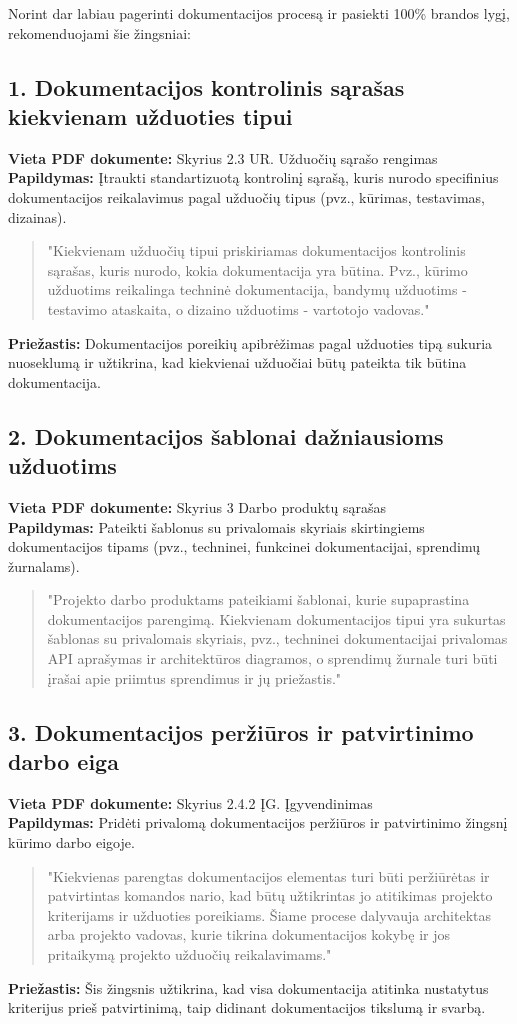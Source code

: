 \documentclass{article}
\begin{document}
Norint dar labiau pagerinti dokumentacijos procesą ir pasiekti 100\% brandos lygį, rekomenduojami šie žingsniai:

\subsection*{1. Dokumentacijos kontrolinis sąrašas kiekvienam užduoties tipui}
\textbf{Vieta PDF dokumente:} Skyrius 2.3 UR. Užduočių sąrašo rengimas \\
\textbf{Papildymas:} Įtraukti standartizuotą kontrolinį sąrašą, kuris nurodo specifinius dokumentacijos reikalavimus pagal užduočių tipus (pvz., kūrimas, testavimas, dizainas).
\begin{quote}
"Kiekvienam užduočių tipui priskiriamas dokumentacijos kontrolinis sąrašas, kuris nurodo, kokia dokumentacija yra būtina. Pvz., kūrimo užduotims reikalinga techninė dokumentacija, bandymų užduotims - testavimo ataskaita, o dizaino užduotims - vartotojo vadovas."
\end{quote}
\textbf{Priežastis:} Dokumentacijos poreikių apibrėžimas pagal užduoties tipą sukuria nuoseklumą ir užtikrina, kad kiekvienai užduočiai būtų pateikta tik būtina dokumentacija.

\subsection*{2. Dokumentacijos šablonai dažniausioms užduotims}
\textbf{Vieta PDF dokumente:} Skyrius 3 Darbo produktų sąrašas \\
\textbf{Papildymas:} Pateikti šablonus su privalomais skyriais skirtingiems dokumentacijos tipams (pvz., techninei, funkcinei dokumentacijai, sprendimų žurnalams).
\begin{quote}
"Projekto darbo produktams pateikiami šablonai, kurie supaprastina dokumentacijos parengimą. Kiekvienam dokumentacijos tipui yra sukurtas šablonas su privalomais skyriais, pvz., techninei dokumentacijai privalomas API aprašymas ir architektūros diagramos, o sprendimų žurnale turi būti įrašai apie priimtus sprendimus ir jų priežastis."
\end{quote}

\subsection*{3. Dokumentacijos peržiūros ir patvirtinimo darbo eiga}
\textbf{Vieta PDF dokumente:} Skyrius 2.4.2 ĮG. Įgyvendinimas \\
\textbf{Papildymas:} Pridėti privalomą dokumentacijos peržiūros ir patvirtinimo žingsnį kūrimo darbo eigoje.
\begin{quote}
"Kiekvienas parengtas dokumentacijos elementas turi būti peržiūrėtas ir patvirtintas komandos nario, kad būtų užtikrintas jo atitikimas projekto kriterijams ir užduoties poreikiams. Šiame procese dalyvauja architektas arba projekto vadovas, kurie tikrina dokumentacijos kokybę ir jos pritaikymą projekto užduočių reikalavimams."
\end{quote}
\textbf{Priežastis:} Šis žingsnis užtikrina, kad visa dokumentacija atitinka nustatytus kriterijus prieš patvirtinimą, taip didinant dokumentacijos tikslumą ir svarbą.
\end{document}
